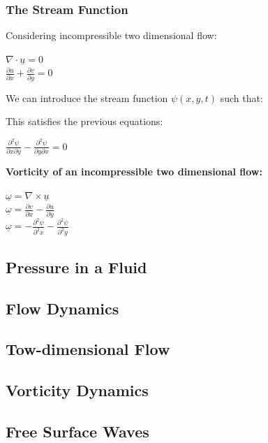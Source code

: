 \subsubsection{The Stream Function}
Considering incompressible two dimensional flow:
\begin{center}
	$\nabla \cdot \underline{u} = 0$
	\\
	$\frac{\partial u}{\partial x} + \frac{\partial v}{\partial y} = 0$	
\end{center}
We can introduce the stream function $\psi (x,y,t)$ such that:
\begin{center}
\end{center}
This satisfies the previous equations:
\begin{center}
	$\frac{\partial^2 \psi}{\partial x \partial y} - \frac{\partial^2 \psi}{\partial y \partial x} = 0$
\end{center}
\textbf{Vorticity of an incompressible two dimensional flow:}
\begin{center}
	$\underline{\omega} = \nabla \times \underline{u}$
	\\
	$\underline{\omega} = \frac{\partial v}{\partial x} - \frac{\partial u}{\partial y}$
	\\
	$\underline{\omega} = -\frac{\partial^2 \psi}{\partial^2 x} - \frac{\partial^2 \psi}{\partial^2 y}$
	\\
	\boxed{\underline{\omega}  = -\nabla^2\psi}
\end{center}
\subsection{Pressure in a Fluid}
\subsection{Flow Dynamics}
\subsection{Tow-dimensional Flow}
\subsection{Vorticity Dynamics}
\subsection{Free Surface Waves}